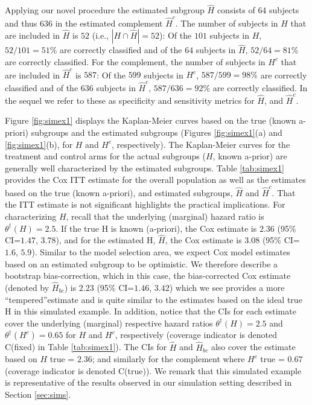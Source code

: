 \documentclass[smallextended]{svjour3}
\def\hplim{\theta^{\dagger}(H)}
\def\hcplim{\theta^{\dagger}(H^{c})}
\begin{document}
Applying our novel procedure the 
estimated subgroup $\hat{H}$ consists of $64$ subjects and thus 
$636$ in the estimated complement $\hat{H}^{c}$. The number of subjects in $H$ that are included in $\hat{H}$ is $52$ (i.e., $|H \cap \hat{H}|=52$): Of the $101$ subjects in $H$, 
$52/101=51\%$ are correctly classified and of the $64$ subjects in $\hat{H}$, $52/64=81\%$ are correctly classified.  For the complement, the number of subjects in $H^{c}$ that are included in $\hat{H}^{c}$ is $587$: Of the $599$ subjects in $H^{c}$, 
$587/599=98\%$ are correctly classified and of the $636$ subjects in $\hat{H}^{c}$, $587/636=92\%$ are correctly classified.
In the sequel we refer to these as specificity and sensitivity metrics for $\hat{H}$, and $\hat{H}^{c}$.

Figure \ref{fig:simex1} displays the Kaplan-Meier curves based on the true (known a-priori) subgroups and the estimated subgroups (Figures \ref{fig:simex1}(a) and \ref{fig:simex1}(b), for $H$ and $H^{c}$, respectively).  The Kaplan-Meier curves for the treatment and control arms for the actual subgroups ($H$, known a-prior) are generally well characterized by the estimated subgroups.  
Table \ref{tab:simex1} provides the Cox ITT estimate for the overall population as well as the estimates based on the true (known a-priori), and estimated subgroups, $\hat{H}$ and $\hat{H}^{c}$.  That the ITT estimate is 
not significant highlights the practical implications.  For characterizing $H$, recall that the underlying (marginal) hazard ratio is $\hplim =2.5$.  If the true H is known (a-priori), the Cox estimate is $2.36$ (95\% CI=$1.47$, 
$3.78$), and for the estimated H, $\hat{H}$, the Cox estimate is $3.08$ (95\% CI=$1.6$, 
$5.9$).  Similar to the model selection area, we expect Cox model estimates based on an estimated subgroup to be optimistic.  We therefore describe a bootstrap bias-correction, 
which in this case, the bias-corrected Cox estimate (denoted by $\hat{H}_{bc}$) is $2.23$ (95\% CI=$1.46$, $3.42$) which we see provides a more ``tempered''estimate and is quite similar to the estimates based on the ideal true H in this simulated example.  
In addition, notice that the CIs for each estimate cover the underlying (marginal) respective hazard ratios 
$\hplim =2.5$ and $\hcplim =0.65$ for $H$ and $H^{c}$, respectively (coverage indicator is denoted C(fixed) in Table \ref{tab:simex1}).  
The CIs for $\hat{H}$ and $\hat{H}_{bc}$ also cover the estimate based on $H$ true =  $2.36$; and similarly for the complement where $H^{c}$ true =  $0.67$ (coverage indicator is denoted C(true)).  We remark that this simulated example is representative of the results observed in our simulation setting described in Section \ref{sec:sims}.
\end{document}
